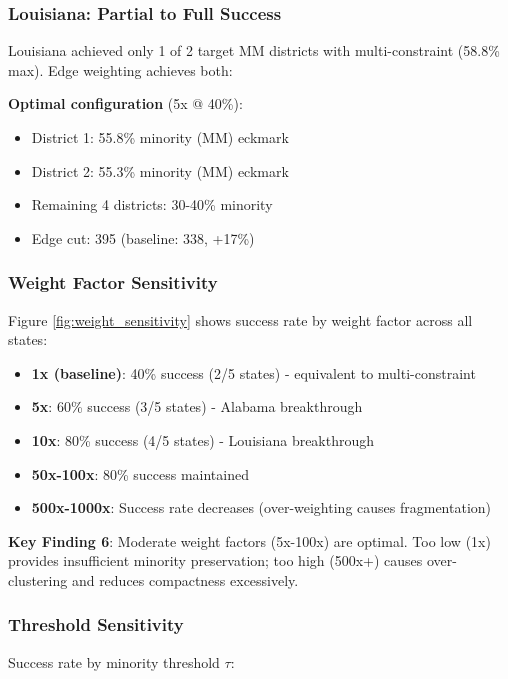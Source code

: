 \subsubsection{Louisiana: Partial to Full Success}

Louisiana achieved only 1 of 2 target MM districts with multi-constraint (58.8\% max). Edge weighting achieves both:

\textbf{Optimal configuration} (5x @ 40\%):
\begin{itemize}
\item District 1: 55.8\% minority (MM)  eckmark
\item District 2: 55.3\% minority (MM)  eckmark
\item Remaining 4 districts: 30-40\% minority
\item Edge cut: 395 (baseline: 338, +17\%)
\end{itemize}

\subsubsection{Weight Factor Sensitivity}

Figure \ref{fig:weight_sensitivity} shows success rate by weight factor across all states:

\begin{itemize}
\item \textbf{1x (baseline)}: 40\% success (2/5 states) - equivalent to multi-constraint
\item \textbf{5x}: 60\% success (3/5 states) - Alabama breakthrough
\item \textbf{10x}: 80\% success (4/5 states) - Louisiana breakthrough
\item \textbf{50x-100x}: 80\% success maintained
\item \textbf{500x-1000x}: Success rate decreases (over-weighting causes fragmentation)
\end{itemize}

\textbf{Key Finding 6}: Moderate weight factors (5x-100x) are optimal. Too low (1x) provides insufficient minority preservation; too high (500x+) causes over-clustering and reduces compactness excessively.

\subsubsection{Threshold Sensitivity}

Success rate by minority threshold $\tau$:


